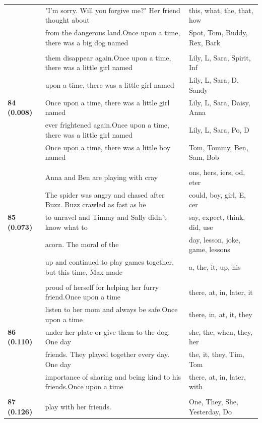 \documentclass{article}
\theoremstyle{plain}
\theoremstyle{definition}
\theoremstyle{remark}
\begin{document}
\begin{longtable}{|p{}|p{}|p{}|}
& "I'm sorry. Will you forgive me?" Her friend thought about & this,  what,  the,  that,  how \\
& from the dangerous land.Once upon a time, there was a big dog named & Spot,  Tom,  Buddy,  Rex,  Bark \\
& & \\
\multirow{5}{*}{\textbf{84 (0.008)}} & them disappear again.Once upon a time, there was a little girl named & Lily,  L,  Sara,  Spirit,  Inf \\
& upon a time, there was a little girl named & Lily,  L,  Sara,  D,  Sandy \\
& Once upon a time, there was a little girl named & Lily,  L,  Sara,  Daisy,  Anna \\
& ever frightened again.Once upon a time, there was a little girl named & Lily,  L,  Sara,  Po,  D \\
& Once upon a time, there was a little boy named & Tom,  Tommy,  Ben,  Sam,  Bob \\
& & \\
\multirow{5}{*}{\textbf{85 (0.073)}} & Anna and Ben are playing with cray & ons, hers, iers, od, eter \\
& The spider was angry and chased after Buzz. Buzz crawled as fast as he & could,  boy,  girl,  E, cer \\
& to unravel and Timmy and Sally didn't know what to & say,  expect,  think,  did,  use \\
& acorn. The moral of the & day,  lesson,  joke,  game,  lessons \\
& up and continued to play games together, but this time, Max made & a,  the,  it,  up,  his \\
& & \\
\multirow{5}{*}{\textbf{86 (0.110)}} & proud of herself for helping her furry friend.Once upon a time & there,  at,  in,  later,  it \\
& listen to her mom and always be safe.Once upon a time & there,  in,  at,  it,  they \\
& under her plate or give them to the dog.  One day & she,  the,  when,  they,  her \\
& friends. They played together every day.  One day & the,  it,  they,  Tim,  Tom \\
& importance of sharing and being kind to his friends.Once upon a time & there,  at,  in,  later,  with \\
& & \\
\multirow{5}{*}{\textbf{87 (0.126)}} & play with her friends. & One,  They,  She,  Yesterday,  Do \\

\end{longtable}
\end{document}
